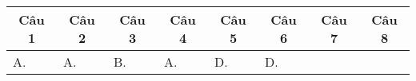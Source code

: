 \begin{longtable}[\textwidth]{|p{}|p{}|p{}|p{}|p{}|p{}|p{}|p{}|}
	\hline%
	\multicolumn{1}{|c|}{\textbf{Câu 1}} & \multicolumn{1}{c|}{\textbf{Câu 2}} & \multicolumn{1}{c|}{\textbf{Câu 3}} &
	\multicolumn{1}{c|}{\textbf{Câu 4}} &
	\multicolumn{1}{c|}{\textbf{Câu 5}} &
	\multicolumn{1}{c|}{\textbf{Câu 6}} &
	\multicolumn{1}{c|}{\textbf{Câu 7}} &
	\multicolumn{1}{c|}{\textbf{Câu 8}} \\
	\hline	A.&A. &B. &A. &D. &D. & &	\\
	\hline
\end{longtable} 
